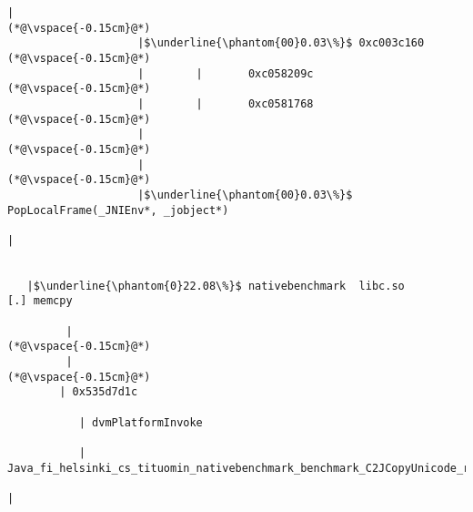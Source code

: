 \begin{lstlisting}[caption=Unicode-merkkijonon kopiointi C$\to$Java, label=profile:C2JCopyUnicode-512, numberbychapter=true, frame=lines, float, floatplacement=t]
                    |
(*@\vspace{-0.15cm}@*)
                    |$\underline{\phantom{00}0.03\%}$ 0xc003c160
(*@\vspace{-0.15cm}@*)
                    |        |       0xc058209c
(*@\vspace{-0.15cm}@*)
                    |        |       0xc0581768
(*@\vspace{-0.15cm}@*)
                    |
(*@\vspace{-0.15cm}@*)
                    |
(*@\vspace{-0.15cm}@*)
                    |$\underline{\phantom{00}0.03\%}$ PopLocalFrame(_JNIEnv*, _jobject*)

| 


   |$\underline{\phantom{0}22.08\%}$ nativebenchmark  libc.so             [.] memcpy

         |
(*@\vspace{-0.15cm}@*)
         |
(*@\vspace{-0.15cm}@*)
        | 0x535d7d1c

           | dvmPlatformInvoke

           | Java_fi_helsinki_cs_tituomin_nativebenchmark_benchmark_C2JCopyUnicode_runInternal

| 



\end{lstlisting}

